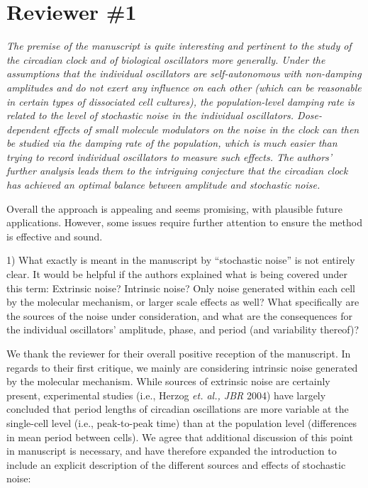 \documentclass[11pt, letterpaper]{article}
\newenvironment{reviewer}{\itshape\color{gray}}{}
\begin{document}
\section*{Reviewer \#1}
\begin{reviewer}
The premise of the manuscript is quite interesting and pertinent to the study of the circadian clock and of biological oscillators more generally. 
Under the assumptions that the individual oscillators are self-autonomous with non-damping amplitudes and do not exert any influence on each other (which can be reasonable in certain types of dissociated cell cultures), the population-level damping rate is related to the level of stochastic noise in the individual oscillators. 
Dose-dependent effects of small molecule modulators on the noise in the clock can then be studied via the damping rate of the population, which is much easier than trying to record individual oscillators to measure such effects. 
The authors' further analysis leads them to the intriguing conjecture that the circadian clock has achieved an optimal balance between amplitude and stochastic noise.

Overall the approach is appealing and seems promising, with plausible future applications. However, some issues require further attention to ensure the method is effective and sound.

1) What exactly is meant in the manuscript by ``stochastic noise'' is not entirely clear. It would be helpful if the authors explained what is being covered under this term: Extrinsic noise? Intrinsic noise? Only noise generated within each cell by the molecular mechanism, or larger scale effects as well? What specifically are the sources of the noise under consideration, and what are the consequences for the individual oscillators' amplitude, phase, and period (and variability thereof)?
\end{reviewer}

We thank the reviewer for their overall positive reception of the manuscript. 
In regards to their first critique, we mainly are considering intrinsic noise generated by the molecular mechanism.
While sources of extrinsic noise are certainly present, experimental studies (i.e., Herzog {\itshape et. al., JBR} 2004) have largely concluded that period lengths of circadian oscillations are more variable at the single-cell level (i.e., peak-to-peak time) than at the population level (differences in mean period between cells).
We agree that additional discussion of this point in manuscript is necessary, and have therefore expanded the introduction to include an explicit description of the different sources and effects of stochastic noise:
\end{document}

